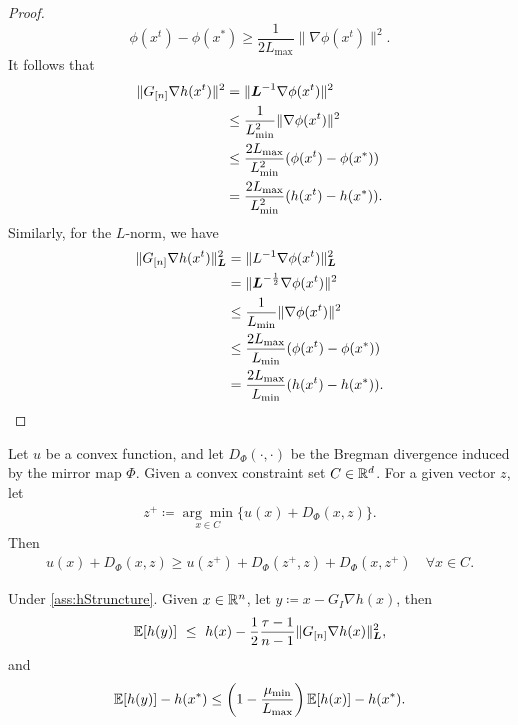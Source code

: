 \begin{proof}
    \[\phi(x^t) - \phi(x^*) \geq \frac{1}{2L_{\max}}\|\nabla \phi(x^t)\|^2.\]
    It follows that 
    \begin{align*}
        \|G_{[n]}\nabla h(x^t)\|^2 &= \|\boldsymbol{L}^{-1}\nabla \phi(x^t)\|^2
        \\&\leq \frac{1}{L_{\min}^2}\|\nabla \phi(x^t)\|^2
        \\&\leq \frac{2L_{\max}}{L_{\min}^2} (\phi(x^t) - \phi(x^*))
        \\&= \frac{2L_{\max}}{L_{\min}^2}(h(x^t) - h(x^*)).
    \end{align*}
    Similarly, for the $L$-norm, we have
    \begin{align*}
        \|G_{[n]}\nabla h(x^t)\|_{\boldsymbol{L}}^2 &= \|L^{-1}\nabla \phi(x^t)\|_{\boldsymbol{L}}^2
        \\&= \|\boldsymbol{L}^{-\frac{1}{2}}\nabla \phi(x^t)\|^2
        \\&\leq \frac{1}{L_{\min}}\|\nabla \phi(x^t)\|^2
        \\&\leq \frac{2L_{\max}}{L_{\min}}(\phi(x^t) - \phi(x^*))
        \\&= \frac{2L_{\max}}{L_{\min}}(h(x^t) - h(x^*)).
    \end{align*}
\end{proof}

\begin{lemma} \label{lemma:threePoints}
    Let $u$ be a convex function, and let $D_\Phi(\cdot, \cdot)$ be the Bregman divergence induced by the mirror map $\Phi$. Given a convex constraint set $C \in \mathbb{R}^d$. For a given vector $z$, let 
    \begin{align} \label{eq:defzplus}
        z^+ \coloneqq \underset{x \in C}{\arg\min} \{ u(x) + D_\Phi(x, z) \}. 
    \end{align}
    Then 
    \begin{align}
        u(x) + D_\Phi(x, z) \geq u(z^+) + D_\Phi(z^+, z) + D_\Phi(x, z^+) \quad \forall x \in C. \label{eq:theePointIneq}
    \end{align}
\end{lemma}

\begin{lemma} \label{lemma:descentLemma}
    Under \autoref{ass:hStruncture}. Given $x \in \mathbb{R}^n$, let $y \coloneqq x - G_I \nabla h(x) $, then
   \begin{align*}
      \mathbb{E}[ h(y) ] ~\leq~ h(x) - \frac{1}{2} \frac{\tau-1}{n-1} \| G_{[n]} \nabla h(x) \|_{\boldsymbol{L}}^2,
   \end{align*}
   and
   \begin{align*}
       \mathbb{E}[ h( y ) ] - h(x^*) \leq \left(1 - \frac{\mu_{\min}}{L_{\max}} \right) \mathbb{E}[ h( x ) ] - h(x^*).
   \end{align*}
\end{lemma}

